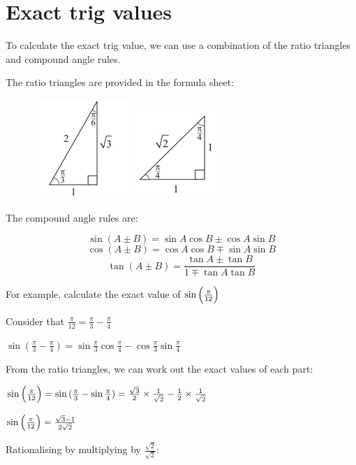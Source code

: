 \documentclass[../main.tex]{subfiles}
\begin{document}
\section{Exact trig values}
To calculate the exact trig value, we can use a combination of the ratio triangles and compound angle rules.

The ratio triangles are provided in the formula sheet:

\begin{figure}[h]
    \centering
    \includegraphics{images/ratiotriangle1.png}
    \includegraphics{images/ratiotriangle2.png}
\end{figure}

The compound angle rules are:

\[\sin{(A\pm B)}=\sin{A}\cos{B}\pm \cos{A}\sin{B}\]
\[\cos{(A\pm B)}=\cos{A}\cos{B}\mp \sin{A}\sin{B}\]
\[\tan{(A\pm B)}=\frac{\tan{A}\pm \tan{B}}{1 \mp \tan{A}\tan{B}}\]

For example, calculate the exact value of $\sin{\Bigl(\frac{\pi}{12}\Bigr)}$

Consider that $\frac{\pi}{12}=\frac{\pi}{3}-\frac{\pi}{4}$

$\sin{(\frac{\pi}{3}-\frac{\pi}{4})}=\sin{\frac{\pi}{3}}\cos{\frac{\pi}{4}}-\cos{\frac{\pi}{3}}\sin{\frac{\pi}{4}}$

From the ratio triangles, we can work out the exact values of each part:

$\sin{\Bigl(\frac{\pi}{12}\Bigr)}=\sin{(\frac{\pi}{3}-\sin{\frac{\pi}{4}})}=\frac{\sqrt{3}}{2}\times \frac{1}{\sqrt{2}}-\frac{1}{2}\times \frac{1}{\sqrt{2}}$

$\sin{\Bigl(\frac{\pi}{12}\Bigr)}=\frac{\sqrt{3}-1}{2\sqrt{2}}$

Rationalising by multiplying by $\frac{\sqrt{2}}{\sqrt{2}}$:
\end{document}
